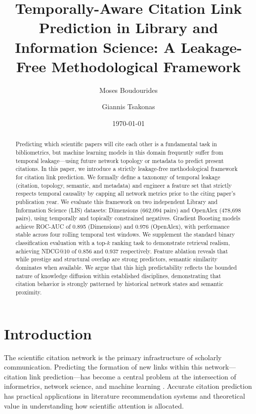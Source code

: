 \documentclass[11pt,a4paper]{article}
\title{Temporally-Aware Citation Link Prediction in Library and Information Science: A Leakage-Free Methodological Framework}
\author[1]{Moses Boudourides}
\author[2]{Giannis Tsakonas}
\affil[1]{Department of Mathematics, University of Patras, Greece}
\affil[2]{Library \& Information Center, University of Patras, Greece}
\date{\today}
\begin{document}
\maketitle

\begin{abstract}
Predicting which scientific papers will cite each other is a fundamental task in bibliometrics, but machine learning models in this domain frequently suffer from temporal leakage---using future network topology or metadata to predict present citations. In this paper, we introduce a strictly leakage-free methodological framework for citation link prediction. We formally define a taxonomy of temporal leakage (citation, topology, semantic, and metadata) and engineer a feature set that strictly respects temporal causality by capping all network metrics prior to the citing paper's publication year. We evaluate this framework on two independent Library and Information Science (LIS) datasets: Dimensions (662,094 pairs) and OpenAlex (478,698 pairs), using temporally and topically constrained negatives. Gradient Boosting models achieve ROC-AUC of 0.895 (Dimensions) and 0.976 (OpenAlex), with performance stable across four rolling temporal test windows. We supplement the standard binary classification evaluation with a top-$k$ ranking task to demonstrate retrieval realism, achieving NDCG@10 of 0.856 and 0.937 respectively. Feature ablation reveals that while prestige and structural overlap are strong predictors, semantic similarity dominates when available. We argue that this high predictability reflects the bounded nature of knowledge diffusion within established disciplines, demonstrating that citation behavior is strongly patterned by historical network states and semantic proximity.
\end{abstract}

\section{Introduction}
\label{sec:intro}

The scientific citation network is the primary infrastructure of scholarly communication. Predicting the formation of new links within this network---citation link prediction---has become a central problem at the intersection of informetrics, network science, and machine learning \citep{wang2013quantifying, shibata2012link}. Accurate citation prediction has practical applications in literature recommendation systems and theoretical value in understanding how scientific attention is allocated.
\end{document}
